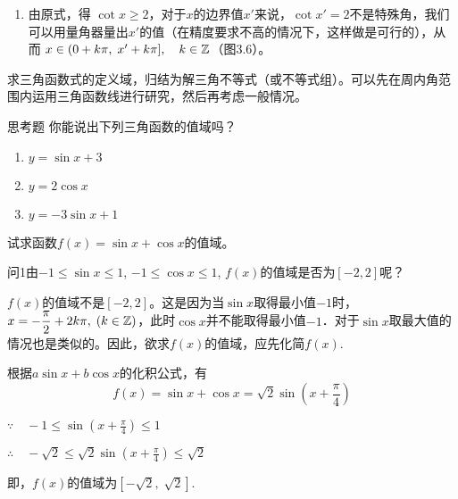 \begin{solution}
\begin{enumerate}[(1)]
\begin{minipage}{.45\textwidth}
\begin{tikzpicture}[>=stealth]
\end{tikzpicture}    
\end{minipage}

\item 由原式，得
$\cot x\ge 2$，对于$x$的边界值$x'$来说，$\cot x'=2$不是特殊角，我们可以用量角器量出$x'$的值（在精度要求不高的情况下，这样做是可行的），从而
$x\in (0+k\pi,\; x'+k\pi],\quad k\in\Z$（图3.6）。
\end{enumerate}
\end{solution}

\begin{remark}
求三角函数式的定义域，归结为解三角不等式（或不等式组）。可以先在周内角范围内运用三角函数线进行研究，然后再考虑一般情况。
\end{remark}

\begin{thm}
    {思考题} 你能说出下列三角函数的值域吗？
\begin{multicols}{3}
\begin{enumerate}[(1)]
    \item $y=\sin x+3$
    \item $y=2\cos x$
    \item $y=-3\sin x+1$
\end{enumerate}    
\end{multicols}
\end{thm}

\begin{example}
试求函数$f(x)=\sin x+\cos x$的值域。
\end{example}

\begin{thm}
  {问1}由$-1\le \sin x\le 1$, $-1\le \cos x\le 1$, $f(x)$的值域是否为$[-2,2]$呢？
\end{thm}

\begin{analyze}
$f(x)$的值域不是$[-2,2]$。这是因为当$\sin x$取得最小值$-1$时，$x=-\frac{\pi}{2}+2k\pi,\; (k\in\Z)$，此时$\cos x$并不能取得最小值$-1$．对于$\sin x$取最大值的情况也是类似的。因此，欲求$f(x)$的值域，应先化简$f(x)$.
\end{analyze}

\begin{solution}
    根据$a\sin x +b\cos x$的化积公式，有
\[f(x)=\sin x+\cos x=\sqrt{2} \sin\left(x+\frac{\pi}{4}\right)\]

$\because\quad -1\le \sin\left(x+\frac{\pi}{4}\right)\le 1$

$\therefore\quad -\sqrt{2}\le \sqrt{2}\sin\left(x+\frac{\pi}{4}\right)\le \sqrt{2}$

即，$f(x)$的值域为$\left[-\sqrt{2},\; \sqrt{2}\right]$.
\end{solution}

